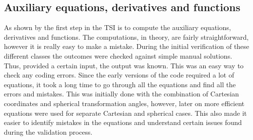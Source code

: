 \subsection{Auxiliary equations, derivatives and functions}
\label{subsec:auxEqDerFunverval}
As shown by  the first step in the \ac{TSI} is to compute the auxiliary equations, derivatives and functions. The computations, in theory, are fairly straightforward, however it is really easy to make a mistake. During the initial verification of these different classes the outcomes were checked against simple manual solutions. Thus, provided a certain input, the output was known. This was an easy way to check any coding errors. Since the early versions of the code required a lot of equations, it took a long time to go through all the equations and find all the errors and mistakes. This was initially done with the combination of Cartesian coordinates and spherical transformation angles, however, later on more efficient equations were used for separate Cartesian and spherical cases. This also made it easier to identify mistakes in the equations and understand certain issues found during the validation process. 

